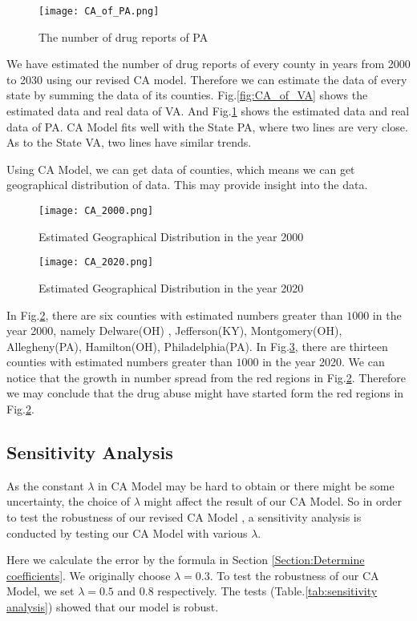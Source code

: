 \documentclass{mcmthesis}
\begin{document}
\begin{figure}[!h]
\small
\centering
\texttt{[image: CA\_of\_PA.png]}
\caption{The number of drug reports of PA} \label{fig:CA_of_PA}
\end{figure}

  We have estimated the number of drug reports of every county in years from 2000 to 2030 using our revised CA model. Therefore we can estimate the data of every state by summing the data of its counties. Fig.\ref{fig:CA_of_VA} shows the estimated data and real data of VA. And Fig.\ref{fig:CA_of_PA} shows the estimated data and real data of PA. CA Model fits well with the State PA, where two lines are very close. As to the State VA, two lines have similar trends.\par
  Using CA Model, we can get data of counties, which means we can get geographical distribution of data. This may provide insight into the data. 
\begin{figure}[!htbp]
\small
\centering
\texttt{[image: CA\_2000.png]}
\caption{Estimated Geographical Distribution in the year 2000} \label{fig:CA_2000}
\end{figure}

\begin{figure}[!htbp]
\small
\centering
\texttt{[image: CA\_2020.png]}
\caption{Estimated Geographical Distribution in the year 2020} \label{fig:CA_2020}
\end{figure}

In Fig.\ref{fig:CA_2000}, there are six counties with estimated numbers greater than $1000$ in the year 2000, namely Delware(OH)  , Jefferson(KY), Montgomery(OH), Allegheny(PA), Hamilton(OH), Philadelphia(PA). In Fig.\ref{fig:CA_2020}, there are thirteen counties with estimated numbers greater than $1000$ in the year 2020. We can notice that the growth in number spread from the red regions in Fig.\ref{fig:CA_2000}. Therefore we may conclude that the drug abuse might have started form the red regions in Fig.\ref{fig:CA_2000}.


\subsection{Sensitivity Analysis}
  As the constant $\lambda$ in CA Model may be hard to obtain or there might be some uncertainty, the choice of $\lambda$ might affect the result of our CA Model. So in order to test the robustness of our revised CA Model , a sensitivity analysis is conducted by testing our CA Model with various $\lambda$. \par
  Here we calculate the error by the formula in Section \ref{Section:Determine coefficients}. We originally choose $\lambda=0.3$. To test the robustness of our CA Model, we set $\lambda=0.5$ and $0.8$ respectively. The tests (Table.\ref{tab:sensitivity analysis}) showed that our model is robust.
\end{document}
